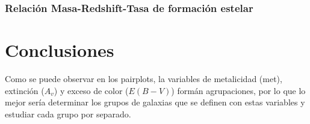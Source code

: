 \documentclass[11pt, a4paper]{article} %
\begin{document}
\subsubsection{Relación Masa-Redshift-Tasa de formación estelar}
\section{Conclusiones}

Como se puede observar en los pairplots, la variables de metalicidad (met), extinción ($A_{v}$) y exceso de color ($E(B-V)$) 
formán agrupaciones, por lo que lo mejor sería determinar los grupos de galaxias que se definen con estas variables y estudiar cada grupo por separado.


\printbibliography

\end{document}

